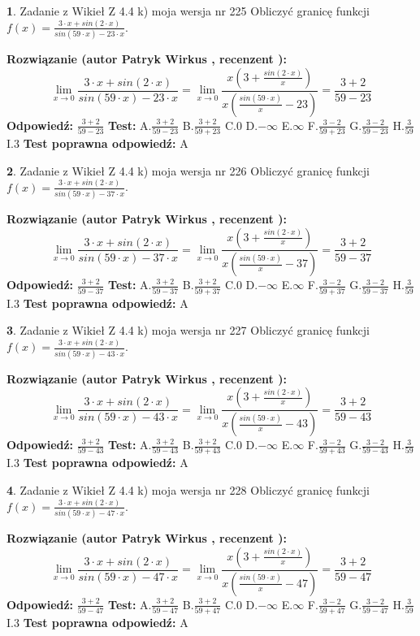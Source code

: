 \documentclass[12pt, a4paper]{article}
\theoremstyle{definition} %
\newtheorem{zad}{}
\newcommand{\zadStart}[1]{\begin{zad}#1\newline}
\newcommand{\zadStop}{\end{zad}}
\newcommand{\rozwStart}[2]{\noindent \textbf{Rozwiązanie (autor #1 , recenzent #2): }\newline}
\newcommand{\rozwStop}{\newline}
\newcommand{\odpStart}{\noindent \textbf{Odpowiedź:}\newline}
\newcommand{\odpStop}{\newline}
\newcommand{\testStart}{\noindent \textbf{Test:}\newline}
\newcommand{\testStop}{\newline}
\newcommand{\kluczStart}{\noindent \textbf{Test poprawna odpowiedź:}\newline}
\newcommand{\kluczStop}{\newline}
\begin{document}
\zadStart{Zadanie z Wikieł Z 4.4 k) moja wersja nr 225}
Obliczyć granicę funkcji $f(x)=\frac{3\cdot x +sin(2\cdot x)}{sin(59\cdot x) -23\cdot x}$.
\zadStop
\rozwStart{Patryk Wirkus}{}
$$\lim\limits_{x\to 0}\frac{3\cdot x +sin(2\cdot x)}{sin(59\cdot x) -23\cdot x}
=\lim\limits_{x\to 0}\frac{x(3+\frac{sin(2\cdot x)}{x})}{x(\frac{sin(59\cdot x)}{x}-23)}
=\frac{3+2}{59-23}$$
\rozwStop
\odpStart
$\frac{3+2}{59-23}$
\odpStop
\testStart
A.$\frac{3+2}{59-23}$
B.$\frac{3+2}{59+23}$
C.$0$
D.$-\infty$
E.$\infty$
F.$\frac{3-2}{59+23}$
G.$\frac{3-2}{59-23}$
H.$\frac{3}{59}$
I.$3$
\testStop
\kluczStart
A
\kluczStop



\zadStart{Zadanie z Wikieł Z 4.4 k) moja wersja nr 226}
Obliczyć granicę funkcji $f(x)=\frac{3\cdot x +sin(2\cdot x)}{sin(59\cdot x) -37\cdot x}$.
\zadStop
\rozwStart{Patryk Wirkus}{}
$$\lim\limits_{x\to 0}\frac{3\cdot x +sin(2\cdot x)}{sin(59\cdot x) -37\cdot x}
=\lim\limits_{x\to 0}\frac{x(3+\frac{sin(2\cdot x)}{x})}{x(\frac{sin(59\cdot x)}{x}-37)}
=\frac{3+2}{59-37}$$
\rozwStop
\odpStart
$\frac{3+2}{59-37}$
\odpStop
\testStart
A.$\frac{3+2}{59-37}$
B.$\frac{3+2}{59+37}$
C.$0$
D.$-\infty$
E.$\infty$
F.$\frac{3-2}{59+37}$
G.$\frac{3-2}{59-37}$
H.$\frac{3}{59}$
I.$3$
\testStop
\kluczStart
A
\kluczStop



\zadStart{Zadanie z Wikieł Z 4.4 k) moja wersja nr 227}
Obliczyć granicę funkcji $f(x)=\frac{3\cdot x +sin(2\cdot x)}{sin(59\cdot x) -43\cdot x}$.
\zadStop
\rozwStart{Patryk Wirkus}{}
$$\lim\limits_{x\to 0}\frac{3\cdot x +sin(2\cdot x)}{sin(59\cdot x) -43\cdot x}
=\lim\limits_{x\to 0}\frac{x(3+\frac{sin(2\cdot x)}{x})}{x(\frac{sin(59\cdot x)}{x}-43)}
=\frac{3+2}{59-43}$$
\rozwStop
\odpStart
$\frac{3+2}{59-43}$
\odpStop
\testStart
A.$\frac{3+2}{59-43}$
B.$\frac{3+2}{59+43}$
C.$0$
D.$-\infty$
E.$\infty$
F.$\frac{3-2}{59+43}$
G.$\frac{3-2}{59-43}$
H.$\frac{3}{59}$
I.$3$
\testStop
\kluczStart
A
\kluczStop



\zadStart{Zadanie z Wikieł Z 4.4 k) moja wersja nr 228}
Obliczyć granicę funkcji $f(x)=\frac{3\cdot x +sin(2\cdot x)}{sin(59\cdot x) -47\cdot x}$.
\zadStop
\rozwStart{Patryk Wirkus}{}
$$\lim\limits_{x\to 0}\frac{3\cdot x +sin(2\cdot x)}{sin(59\cdot x) -47\cdot x}
=\lim\limits_{x\to 0}\frac{x(3+\frac{sin(2\cdot x)}{x})}{x(\frac{sin(59\cdot x)}{x}-47)}
=\frac{3+2}{59-47}$$
\rozwStop
\odpStart
$\frac{3+2}{59-47}$
\odpStop
\testStart
A.$\frac{3+2}{59-47}$
B.$\frac{3+2}{59+47}$
C.$0$
D.$-\infty$
E.$\infty$
F.$\frac{3-2}{59+47}$
G.$\frac{3-2}{59-47}$
H.$\frac{3}{59}$
I.$3$
\testStop
\kluczStart
A
\kluczStop
\end{document}
